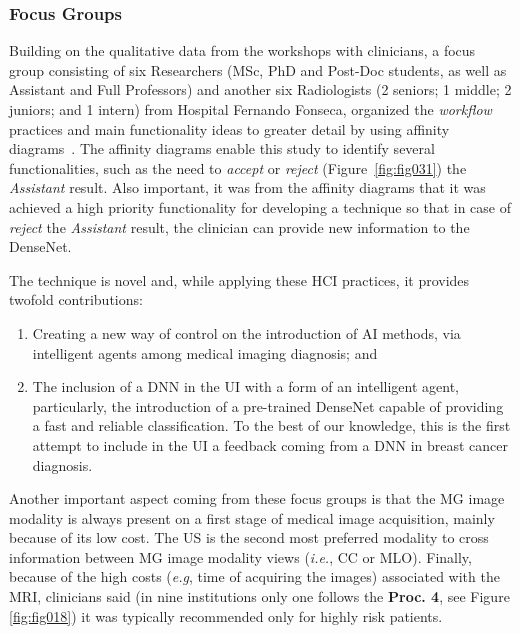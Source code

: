\subsubsection{Focus Groups}
\label{sec:chap005003003002}

Building on the qualitative data from the workshops with clinicians, a focus group consisting of six Researchers (MSc, PhD and Post-Doc students, as well as Assistant and Full Professors) and another six Radiologists (2 seniors; 1 middle; 2 juniors; and 1 intern) from Hospital Fernando Fonseca, organized the {\it workflow} practices and main functionality ideas to greater detail by using affinity diagrams~\cite{Harboe:2012:CSC:2145204.2145379, Hoiseth:2013:RGD:2468356.2468436}.
The affinity diagrams enable this study to identify several functionalities, such as the need to {\it accept} or {\it reject} (Figure~\ref{fig:fig031}) the {\it Assistant} result.
Also important, it was from the affinity diagrams that it was achieved a high priority functionality for developing a technique so that in case of {\it reject} the {\it Assistant} result, the clinician can provide new information to the DenseNet.

\noindent
The technique is novel and, while applying these \ac{HCI} practices, it provides twofold contributions:

\vspace{0.50mm}

\begin{enumerate}
\item Creating a new way of control on the introduction of \ac{AI} methods, via intelligent agents among medical imaging diagnosis; and
\item The inclusion of a \ac{DNN} in the \ac{UI} with a form of an intelligent agent, particularly, the introduction of a pre-trained DenseNet capable of providing a fast and reliable classification. To the best of our knowledge, this is the first attempt to include in the \ac{UI} a feedback coming from a \ac{DNN} in breast cancer diagnosis.
\end{enumerate}

\vspace{0.50mm}

Another important aspect coming from these focus groups is that the \ac{MG} image modality is always present on a first stage of medical image acquisition, mainly because of its low cost.
The \ac{US} is the second most preferred modality to cross information between \ac{MG} image modality views ({\it i.e.}, \ac{CC} or \ac{MLO}).
Finally, because of the high costs ({\it e.g}, time of acquiring the images) associated with the \ac{MRI}, clinicians said (in nine institutions only one follows the {\bf Proc. 4}, see Figure \ref{fig:fig018}) it was typically recommended only for highly risk patients.

